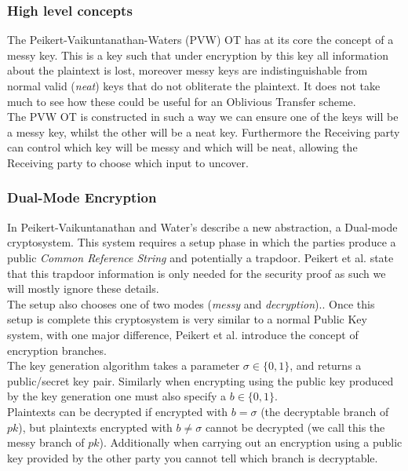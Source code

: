 \documentclass[ %
                    author={Nicholas Tutte},
                supervisor={Prof. Nigel Smart},
                    degree={MEng},
                     title={Secure Two Party Computation},
                  subtitle={A practical comparison of recent protocols},
                      type={Research - GG1K},
                      year={2015} ]{dissertation}
\begin{document}
				\subsubsection{High level concepts}
					The Peikert-Vaikuntanathan-Waters (PVW) OT has at its core the concept of a messy key. This is a key such that under encryption by this key all information about the plaintext is lost, moreover messy keys are indistinguishable from normal valid (\emph{neat}) keys that do not obliterate the plaintext. It does not take much to see how these could be useful for an Oblivious Transfer scheme.\\

					The PVW OT is constructed in such a way we can ensure one of the keys will be a messy key, whilst the other will be a neat key. Furthermore the Receiving party can control which key will be messy and which will be neat, allowing the Receiving party to choose which input to uncover.

				\subsubsection{Dual-Mode Encryption}
					In \cite{PVW_OT_2008} Peikert-Vaikuntanathan and Water's describe a new abstraction, a Dual-mode cryptosystem. This system requires a setup phase in which the parties produce a public \emph{Common Reference String} and potentially a trapdoor. Peikert et al. state that this trapdoor information is only needed for the security proof as such we will mostly ignore these details.\\

					The setup also chooses one of two modes (\emph{messy} and \emph{decryption}).. Once this setup is complete this cryptosystem is very similar to a normal Public Key system, with one major difference, Peikert et al. introduce the concept of encryption branches.\\

					The key generation algorithm takes a parameter $\sigma \in \{0, 1\}$, and returns a public/secret key pair. Similarly when encrypting using the public key produced by the key generation one must also specify a $b \in \{0, 1\}$.\\

					Plaintexts can be decrypted if encrypted with $b = \sigma$ (the decryptable branch of $pk$), but plaintexts encrypted with $b \neq \sigma$ cannot be decrypted (we call this the messy branch of $pk$). Additionally when carrying out an encryption using a public key provided by the other party you cannot tell which branch is decryptable.\\
\end{document}
